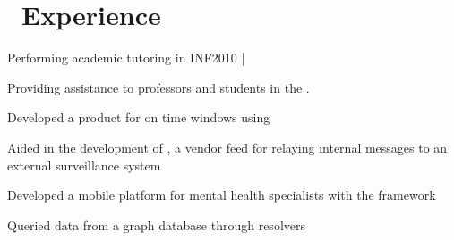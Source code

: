 \section{\faBriefcase \ Experience}

\hfill
\hfill
\begin{tightemize}
\item Performing academic tutoring in INF2010 | 
\item Providing assistance to professors and students in the .
\end{tightemize}

\sectionsep 

\begin{tightemize}
\item Developed a product for  on  time windows using 
\item Aided in the development of , a vendor feed for relaying internal messages to an external surveillance system
\end{tightemize}

\sectionsep 

\begin{tightemize}
\item Developed a mobile platform for mental health specialists with the  framework
\item Queried data from a  graph database through  resolvers
\end{tightemize}
